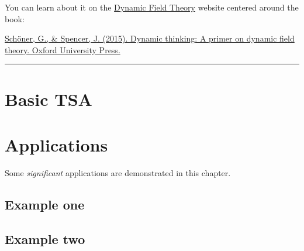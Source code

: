 \documentclass[12pt,]{book}
\let\stdsection\section
\renewcommand\section{\newpage\stdsection}
\begin{document}
You can learn about it on the \href{http://www.dynamicfieldtheory.org}{Dynamic Field Theory} website centered around the book:

\href{http://www.oxfordscholarship.com/view/10.1093/acprof:oso/9780199300563.001.0001/acprof-9780199300563}{Schöner, G., \& Spencer, J. (2015). Dynamic thinking: A primer on dynamic field theory. Oxford University Press.}

\begin{center}\rule{0.5\linewidth}{\linethickness}\end{center}

\hypertarget{basic-tsa}{%
\chapter{Basic TSA}\label{basic-tsa}}

\hypertarget{applications}{%
\chapter{Applications}\label{applications}}

Some \emph{significant} applications are demonstrated in this chapter.

\hypertarget{example-one}{%
\section{Example one}\label{example-one}}

\hypertarget{example-two}{%
\section{Example two}\label{example-two}}
\end{document}
